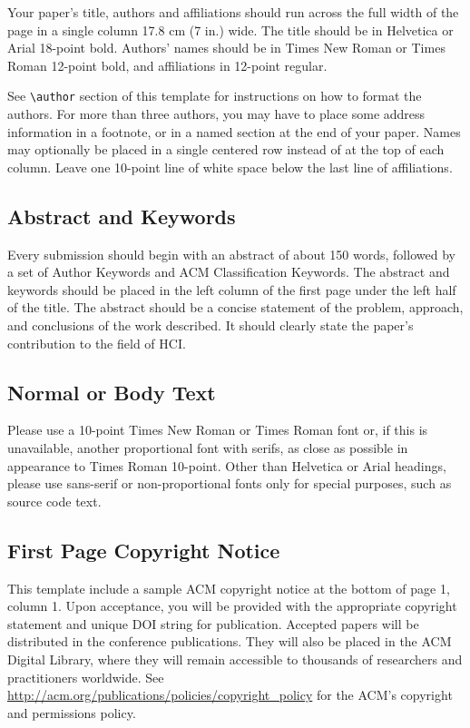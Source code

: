 \documentclass{sigchi}
\begin{document}
Your paper's title, authors and affiliations should run across the
full width of the page in a single column 17.8 cm (7 in.) wide.  The
title should be in Helvetica or Arial 18-point bold.  Authors' names
should be in Times New Roman or Times Roman 12-point bold, and
affiliations in 12-point regular.  

See \texttt{{\textbackslash}author} section of this template for
instructions on how to format the authors. For more than three
authors, you may have to place some address information in a footnote,
or in a named section at the end of your paper. Names may optionally
be placed in a single centered row instead of at the top of each
column. Leave one 10-point line of white space below the last line of
affiliations.

\subsection{Abstract and Keywords}

Every submission should begin with an abstract of about 150 words,
followed by a set of Author Keywords and ACM Classification
Keywords. The abstract and keywords should be placed in the left
column of the first page under the left half of the title. The
abstract should be a concise statement of the problem, approach, and
conclusions of the work described. It should clearly state the paper's
contribution to the field of HCI\@.

\subsection{Normal or Body Text}

Please use a 10-point Times New Roman or Times Roman font or, if this
is unavailable, another proportional font with serifs, as close as
possible in appearance to Times Roman 10-point. Other than Helvetica
or Arial headings, please use sans-serif or non-proportional fonts
only for special purposes, such as source code text.

\subsection{First Page Copyright Notice}
This template include a sample ACM copyright notice at the bottom of
page 1, column 1.  Upon acceptance, you will be provided with the
appropriate copyright statement and unique DOI string for publication.
Accepted papers will be distributed in the conference
publications. They will also be placed in the ACM Digital Library,
where they will remain accessible to thousands of researchers and
practitioners worldwide. See
\url{http://acm.org/publications/policies/copyright_policy} for the
ACM's copyright and permissions policy.
\end{document}
